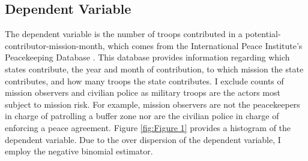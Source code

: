\documentclass[12pt]{article}
\begin{document}

\subsection*{Dependent Variable}

The dependent variable is the number of troops contributed in a potential-contributor-mission-month, which comes from the International Peace Institute's Peacekeeping Database \citep{perry2013}. This database provides information regarding which states contribute, the year and month of contribution, to which mission the state contributes, and how many troops the state contributes. I exclude counts of mission observers and civilian police as military troops are the actors most subject to mission risk. For example, mission observers are not the peacekeepers in charge of patrolling a buffer zone nor are the civilian police in charge of enforcing a peace agreement. Figure \ref{fig:Figure 1} provides a histogram of the dependent variable. Due to the over dispersion of the dependent variable, I employ the negative binomial estimator. 
\end{document}
